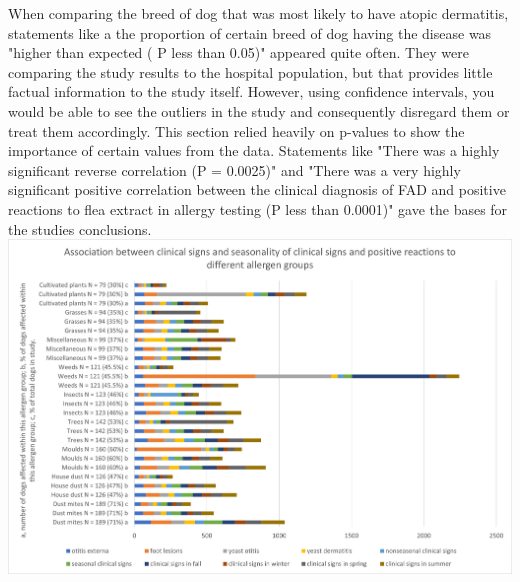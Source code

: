 \documentclass{article}
\numberwithin{equation}{section}
\begin{document}
 When comparing the breed of dog that was most likely to have atopic dermatitis, statements like a the proportion of certain breed of dog having the disease was "higher than expected ( P less than 0.05)" appeared quite often. They were comparing the study results to the hospital population, but that provides little factual information to the study itself. However, using confidence intervals, you would be able to see the outliers in the study and consequently disregard them or treat them accordingly.  This section relied heavily on p-values to show the importance of certain values from the data. Statements like "There was a highly signiﬁcant reverse correlation (P = 0.0025)" and "There was a very highly signiﬁcant positive correlation between the clinical diagnosis of FAD and positive reactions to ﬂea extract in allergy testing (P less than 0.0001)" gave the bases for the studies conclusions. 
\includegraphics[scale = 0.6]{Association between clinical signs and seasonality of clinical signs and positive reactions to different allergen groups.jpg}
\end{document}
